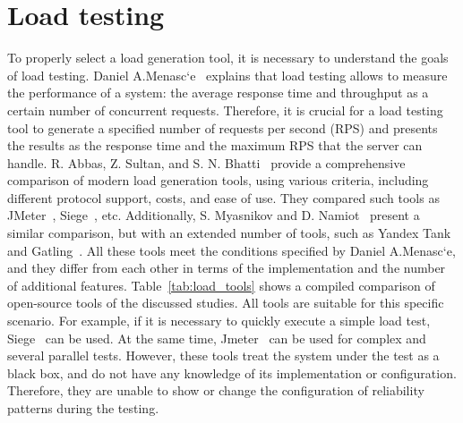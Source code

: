 \section{Load testing}\label{sec:load_generation}
To properly select a load generation tool, it is necessary to understand the goals of load testing. Daniel A.Menasc`e~\cite{load_testing_base} explains that load testing allows to measure the performance of a system: the average response time and throughput as a certain number of concurrent requests. Therefore, it is crucial for a load testing tool to generate a specified number of requests per second (RPS) and presents the results as the response time and the maximum RPS that the server can handle.
R. Abbas, Z. Sultan, and S. N. Bhatti~\cite{load_testing_tools} provide a comprehensive comparison of modern load generation tools, using various criteria, including different protocol support, costs, and ease of use. They compared such tools as JMeter~\cite{jmeter}, Siege~\cite{siege}, etc. Additionally, S. Myasnikov and D. Namiot~\cite{load_testing_tools_rus} present a similar comparison, but with an extended number of tools, such as Yandex Tank~\cite{yandex_tank} and Gatling~\cite{gatling}. All these tools meet the conditions specified by Daniel A.Menasc`e, and they differ from each other in terms of the implementation and the number of additional features. Table~\ref{tab:load_tools} shows a compiled comparison of open-source tools of the discussed studies.
All tools are suitable for this specific scenario. For example, if it is necessary to quickly execute a simple load test, Siege~\cite{siege} can be used. At the same time, Jmeter~\cite{jmeter} can be used for complex and several parallel tests. However, these tools treat the system under the test as a black box, and do not have any knowledge of its implementation or configuration. Therefore, they are unable to show or change the configuration of reliability patterns during the testing.

